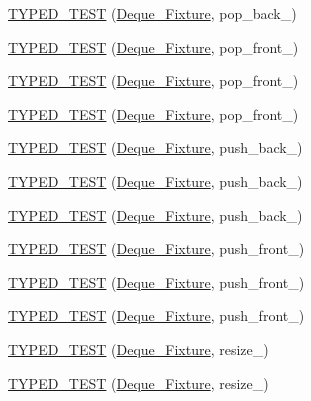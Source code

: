 \begin{DoxyCompactItemize}
\hyperlink{TestDeque_8c_09_09_a65c04ed6ef621fe21d10625c1d0653d8}{T\-Y\-P\-E\-D\-\_\-\-T\-E\-S\-T} (\hyperlink{structDeque__Fixture}{Deque\-\_\-\-Fixture}, pop\-\_\-back\-\_)
\item 
\hyperlink{TestDeque_8c_09_09_aaf01d720fa46a6f747d75f20596e21b8}{T\-Y\-P\-E\-D\-\_\-\-T\-E\-S\-T} (\hyperlink{structDeque__Fixture}{Deque\-\_\-\-Fixture}, pop\-\_\-front\-\_)
\item 
\hyperlink{TestDeque_8c_09_09_abbb4c292a81f7589d69ddba6c7075513}{T\-Y\-P\-E\-D\-\_\-\-T\-E\-S\-T} (\hyperlink{structDeque__Fixture}{Deque\-\_\-\-Fixture}, pop\-\_\-front\-\_)
\item 
\hyperlink{TestDeque_8c_09_09_a2cb765fac9b5884b9458e05cb36296bf}{T\-Y\-P\-E\-D\-\_\-\-T\-E\-S\-T} (\hyperlink{structDeque__Fixture}{Deque\-\_\-\-Fixture}, pop\-\_\-front\-\_)
\item 
\hyperlink{TestDeque_8c_09_09_aad2f11d8064b588dbb13ad910f8bec8b}{T\-Y\-P\-E\-D\-\_\-\-T\-E\-S\-T} (\hyperlink{structDeque__Fixture}{Deque\-\_\-\-Fixture}, push\-\_\-back\-\_)
\item 
\hyperlink{TestDeque_8c_09_09_a9954b5886fdbe9e556bddf361e98583b}{T\-Y\-P\-E\-D\-\_\-\-T\-E\-S\-T} (\hyperlink{structDeque__Fixture}{Deque\-\_\-\-Fixture}, push\-\_\-back\-\_)
\item 
\hyperlink{TestDeque_8c_09_09_adeb2f272f3d2f0a24345f61efc66336b}{T\-Y\-P\-E\-D\-\_\-\-T\-E\-S\-T} (\hyperlink{structDeque__Fixture}{Deque\-\_\-\-Fixture}, push\-\_\-back\-\_)
\item 
\hyperlink{TestDeque_8c_09_09_adf15c6d05f809d7a9ef1cc07ee23f2e4}{T\-Y\-P\-E\-D\-\_\-\-T\-E\-S\-T} (\hyperlink{structDeque__Fixture}{Deque\-\_\-\-Fixture}, push\-\_\-front\-\_)
\item 
\hyperlink{TestDeque_8c_09_09_aa13aeee300db505318edf805430d9ae1}{T\-Y\-P\-E\-D\-\_\-\-T\-E\-S\-T} (\hyperlink{structDeque__Fixture}{Deque\-\_\-\-Fixture}, push\-\_\-front\-\_)
\item 
\hyperlink{TestDeque_8c_09_09_ad1b5047323229e3454354eea42c484e1}{T\-Y\-P\-E\-D\-\_\-\-T\-E\-S\-T} (\hyperlink{structDeque__Fixture}{Deque\-\_\-\-Fixture}, push\-\_\-front\-\_)
\item 
\hyperlink{TestDeque_8c_09_09_aeb9f20d27f3f6003564243eaadbefc27}{T\-Y\-P\-E\-D\-\_\-\-T\-E\-S\-T} (\hyperlink{structDeque__Fixture}{Deque\-\_\-\-Fixture}, resize\-\_)
\item 
\hyperlink{TestDeque_8c_09_09_a503cd45ad8b6748e5e0edf560c840b8e}{T\-Y\-P\-E\-D\-\_\-\-T\-E\-S\-T} (\hyperlink{structDeque__Fixture}{Deque\-\_\-\-Fixture}, resize\-\_)

\end{DoxyCompactItemize}
